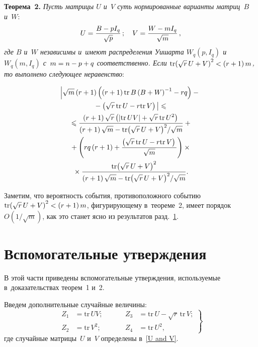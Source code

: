 \begin{multicols}{2}
\smallskip

\noindent
\textbf{Теорема~2.}
\textit{Пусть матрицы $U$ и~$V$ суть нормированные варианты матриц~$B$ и~$W$}:
    \begin{equation}
    \label{U and V}
    U=  \displaystyle\frac{\displaystyle B-pI_{q}\mathstrut}{\displaystyle \sqrt{p}\mathstrut}\,;\quad V= \displaystyle\frac{\displaystyle W-mI_{q}\mathstrut}{\displaystyle \sqrt{m}\mathstrut}\,,
    \end{equation}
     \textit{где $B$ и~$W$ независимы и~имеют распределения Уишарта $W_{q}\left(p, 
I_{q}\right)$ и~$W_{q}\left(m, I_{q}\right)$ с~$m\hm=n\hm-p\hm +q$ соответственно.
    Если $\mathrm{tr}{\left(\sqrt{r}\,U\hm+V\right)^{2}}\hm<\left(r\hm+1\right)m$, то выполнено 
следующее неравенство}:

\noindent
    \begin{multline}
    \label{Theor2}
     \left|\sqrt{m}\left(r+1\right)\left(\left(r+1\right)\mathrm{tr}\,{B\left(B+W\right)^{-1}}-
     rq\right)-{}\right.\\
\left.     {}-\left(\sqrt{r}\,\mathrm{tr}\,{U}-r\mathrm{tr}\,{V}\right)
\vphantom{\sqrt{}W^{-1}}
\right|\leqslant{}\\
{}\leqslant
\fr{ \left(r+1\right)\sqrt{r}\left(\left| \mathrm{tr}\,{UV}\right|+
\sqrt{r}\,\mathrm{tr}\,U^{2}\right)}
{ \left(r+1\right)\sqrt{m}-
{\mathrm{tr}{\left(\sqrt{r}\,U+V\right)^{2}}}/{\sqrt{m}}}+{}\\
{}+
     \left(   rq\left(r+1\right)+\fr{\left(\sqrt{r}\,\mathrm{tr}\,{U}-r\mathrm{tr}\,{V}\right)}
     {\sqrt{m}}\right)\times{}\\
     {}\times 
     \fr{\mathrm{tr}{\left(\sqrt{r}\,U+V\right)^{2}}}
     { \left(r+1\right)\sqrt{m}-
{\mathrm{tr}{\left(\sqrt{r}\,U+V\right)^{2}}}/{\sqrt{m}}}.
    \end{multline}



Заметим, что   вероятность события, противоположного событию 
$\mathrm{tr}{\left(\sqrt{r}\,U\hm+V\right)^{2}}\hm<\left(r\hm+1\right)m$, фигурирующему 
в~теореме~2, имеет порядок $O\left( {1}/{\sqrt{m}}\right)$, 
как это станет ясно из результатов разд.~\ref{sec:lemmas}.

\section{Вспомогательные утверждения}
\label{sec:lemmas}


В этой части приведены вспомогательные утверж\-де\-ния, используемые 
в~доказательствах тео\-рем~1 и~2.

Введем дополнительные случайные величины:
\begin{equation}
\left.
\begin{array}{rlrl}
Z_1 &= \mathrm{tr}\,{UV};&\hspace{1cm} Z_3 &= \mathrm{tr}\,{U}-\sqrt{r}\,\mathrm{tr}\,{V};\\[6pt]
Z_2 &= \mathrm{tr}\,{V^{2}}; &\hspace{1cm} Z_4 &= \mathrm{tr}\,{U^{2}},
\end{array}
\right\}
\label{Z_i}
\end{equation}
где случайные матрицы~$U$ и~$V$ определены в~\eqref{U and V}.


\end{multicols}
